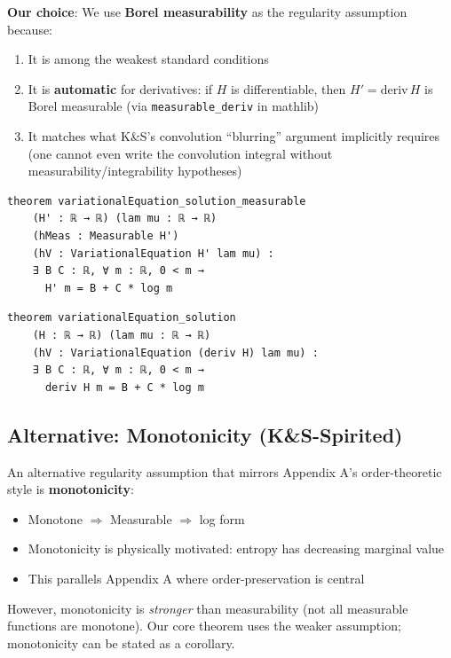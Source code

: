 \documentclass[11pt]{article}
\theoremstyle{definition}
\theoremstyle{remark}
\begin{document}
\textbf{Our choice}: We use \textbf{Borel measurability} as the regularity assumption because:
\begin{enumerate}
\item It is among the weakest standard conditions
\item It is \textbf{automatic} for derivatives: if $H$ is differentiable, then $H' = \text{deriv}\, H$ is Borel measurable (via \texttt{measurable\_deriv} in mathlib)
\item It matches what K\&S's convolution ``blurring'' argument implicitly requires (one cannot even write the convolution integral without measurability/integrability hypotheses)
\end{enumerate}

\begin{lstlisting}[caption={Main Variational Theorem (measurable version)}]
theorem variationalEquation_solution_measurable
    (H' : ℝ → ℝ) (lam mu : ℝ → ℝ)
    (hMeas : Measurable H')
    (hV : VariationalEquation H' lam mu) :
    ∃ B C : ℝ, ∀ m : ℝ, 0 < m →
      H' m = B + C * log m
\end{lstlisting}

\begin{lstlisting}[caption={Corollary for actual derivatives (regularity automatic)}]
theorem variationalEquation_solution
    (H : ℝ → ℝ) (lam mu : ℝ → ℝ)
    (hV : VariationalEquation (deriv H) lam mu) :
    ∃ B C : ℝ, ∀ m : ℝ, 0 < m →
      deriv H m = B + C * log m
\end{lstlisting}

\subsection{Alternative: Monotonicity (K\&S-Spirited)}

An alternative regularity assumption that mirrors Appendix A's order-theoretic style is \textbf{monotonicity}:

\begin{itemize}
\item Monotone $\Rightarrow$ Measurable $\Rightarrow$ log form
\item Monotonicity is physically motivated: entropy has decreasing marginal value
\item This parallels Appendix A where order-preservation is central
\end{itemize}

However, monotonicity is \emph{stronger} than measurability (not all measurable functions are monotone).
Our core theorem uses the weaker assumption; monotonicity can be stated as a corollary.
\end{document}
